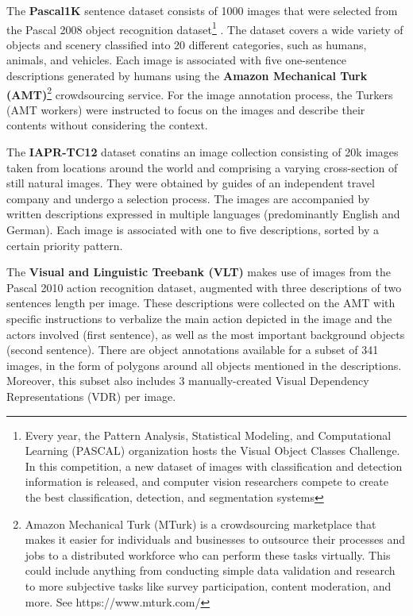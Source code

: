 The \textbf{Pascal1K} sentence dataset \citet{Rashtchian2010} consists of 1000 images that were selected from the Pascal 2008 object recognition dataset\footnote{Every year, the Pattern Analysis, Statistical Modeling, and Computational Learning (PASCAL) organization hosts the Visual Object Classes Challenge. In this competition, a new dataset of images with classification and detection information is released, and computer vision researchers compete to create the best classification, detection, and segmentation systems} \citep{Everingham2010}. The dataset covers a wide variety of objects and scenery classified into 20 different categories, such as humans, animals, and vehicles. Each image is associated with five one-sentence descriptions generated by humans using the \textbf{Amazon Mechanical Turk (AMT)}\footnote{Amazon Mechanical Turk (MTurk) is a crowdsourcing marketplace that makes it easier for individuals and businesses to outsource their processes and jobs to a distributed workforce who can perform these tasks virtually. This could include anything from conducting simple data validation and research to more subjective tasks like survey participation, content moderation, and more. See https://www.mturk.com/ \nopagebreak} crowdsourcing service. For the image annotation process, the Turkers (AMT workers) were instructed to focus on the images and describe their contents without considering the context.

The \textbf{IAPR-TC12} dataset \citep{Escalante2010} conatins an image collection consisting of 20k images taken from locations around the world and comprising a varying cross-section of still natural images. They were obtained by guides of an independent travel company and undergo a selection process. The images are accompanied by written descriptions expressed in multiple languages (predominantly English and German). Each image is associated with one to five descriptions, sorted by a certain priority pattern.

The \textbf{Visual and Linguistic Treebank (VLT)}  \citep{Elliott2013} makes use of images from the Pascal 2010 action recognition dataset, augmented with three descriptions of two sentences length per image. These descriptions were collected on the AMT with specific instructions to verbalize the main action depicted in the image and the actors involved (first sentence), as well as the most important background objects (second sentence). There are object annotations available for a subset of 341 images, in the form of polygons around all objects mentioned in the descriptions. Moreover, this subset also includes 3 manually-created Visual Dependency Representations (VDR) per image. 


